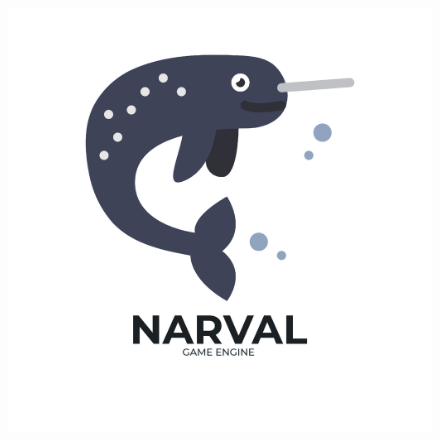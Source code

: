 \documentclass[12pt, 
openright, 
oneside, 
a4paper,    
brazil]{facom-ufu-abntex2}
\begin{document}
\begin{figure}[H]
	\centering
	\includegraphics[width=\textwidth]{imagens/logo.png}
\end{figure}
\clearpage



\listoffigures*
\cleardoublepage


\listoftables*
\cleardoublepage

\lstlistoflistings
\cleardoublepage

\end{document}
